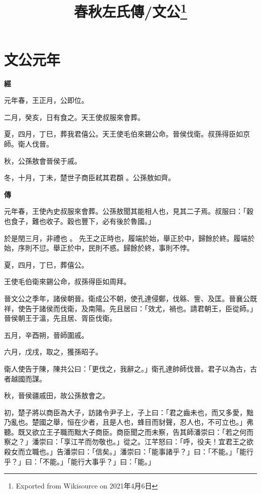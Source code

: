 \documentclass[fontset = none]{ctexart}
\title{春秋左氏傳/文公\footnote{Exported from Wikisource on 2021年4月6日}}
\begin{document}
\maketitle












\section{文公元年}





\textbf{經}



元年春，王正月，公即位。

二月，癸亥，日有食之。天王使叔服來會葬。

夏，四月，丁巳，葬我君僖公。天王使毛伯來錫公命。晉侯伐衛。叔孫得臣如京師。衛人伐晉。

秋，公孫敖會晉侯于戚。

冬，十月，丁未，楚世子商臣弒其君頵 。公孫敖如齊。

\textbf{傳}



元年春，王使內史叔服來會葬。公孫敖聞其能相人也，見其二子焉。叔服曰：「穀也食子，難也收子。穀也豐下，必有後於魯國。」

於是閏三月，非禮也 。
先王之正時也，履端於始，舉正於中，歸餘於終。履端於始，序則不愆。舉正於中，民則不惑。歸餘於終，事則不悖。

夏，四月，丁巳，葬僖公。

王使毛伯衛來錫公命，叔孫得臣如周拜。

晉文公之季年，諸侯朝晉。衛成公不朝，使孔達侵鄭，伐緜、訾、及匡。晉襄公既祥，使告于諸侯而伐衛，及南陽。先且居曰：「效尤，禍也。請君朝王，臣從師。」晉侯朝王于溫，先且居、胥臣伐衛。

五月，辛酉朔，晉師圍戚。

六月，戊戌，取之，獲孫昭子。

衛人使告于陳，陳共公曰：「更伐之，我辭之。」衛孔達帥師伐晉。君子以為古，古者越國而謀。

秋，晉侯疆戚田，故公孫敖會之。

初，楚子將以商臣為大子，訪諸令尹子上，子上曰：「君之齒未也，而又多愛，黜乃亂也。楚國之舉，恒在少者，且是人也，蜂目而豺聲，忍人也，不可立也。」弗聽。既又欲立王子職而黜大子商臣。商臣聞之而未察，告其師潘崇曰：「若之何而察之？」潘崇曰：「享江芊而勿敬也。」從之。江芊怒曰：「呼，役夫！宜君王之欲殺女而立職也。」告潘崇曰：「信矣。」潘崇曰：「能事諸乎？」曰：「不能。」「能行乎？」曰：「不能。」「能行大事乎？」曰：「能。」
\end{document}
